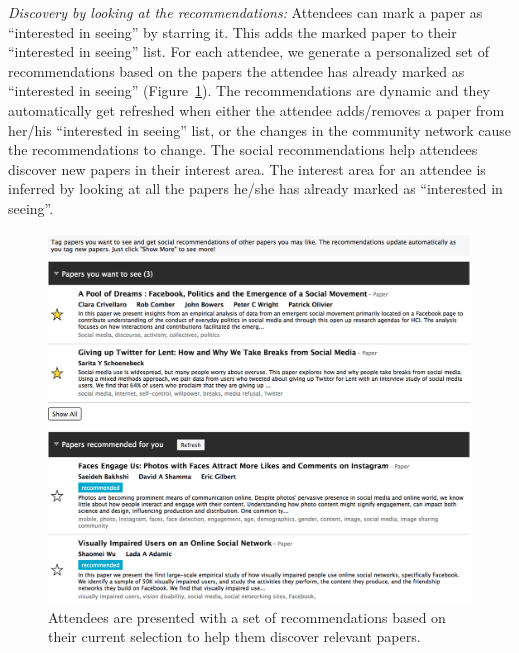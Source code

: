 \documentclass{sigchi}
\begin{document}
\emph{Discovery by looking at the recommendations:} Attendees can mark a paper as ``interested in seeing'' by starring it. This adds the marked paper to their ``interested in seeing'' list. For each attendee, we generate a personalized set of recommendations based on the papers the attendee has already marked as ``interested in seeing'' (Figure~\ref{confer-recommendations}). The recommendations are dynamic and they automatically get refreshed when either the attendee adds/removes a paper from her/his ``interested in seeing'' list, or the changes in the community network cause the recommendations to change. The social recommendations help attendees discover new papers in their interest area. The interest area for an attendee is inferred by looking at all the papers he/she has already marked as ``interested in seeing''.
\begin{figure}[!h]
\centering
\includegraphics[width=0.95\columnwidth]{confer-recommendations.png}
\caption{Attendees are presented with a set of recommendations based on their current selection to help them discover relevant papers.}
\label{confer-recommendations}
\end{figure}
\end{document}
